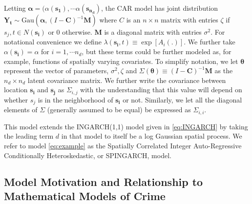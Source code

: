 \documentclass[11pt]{isuthesis}
\begin{document}
  Letting $\boldsymbol{\alpha}=(\alpha(\boldsymbol{s_1}),\cdots \alpha(\boldsymbol{s_{n_d}})$, the CAR model has joint distribution $\boldsymbol{Y_t}\sim \mbox{Gau}(\boldsymbol{\alpha},(I-\boldsymbol{C})^{-1}\boldsymbol{M})$ where $C$ is an $n \times n$ matrix with entries $\zeta$ if $s_j,t \in N(\boldsymbol{s_i})$ or $0$ otherwise. $\boldsymbol{M}$ is a diagonal matrix with entries $\sigma^2$. For notational convenience we define $\lambda(\boldsymbol{s_i},t)\equiv\exp \left[ A_i(.) \right]$.  We further take $\alpha(\boldsymbol{s_i})=\alpha$ for $i=1,\cdots n_d$, but these terms could be further modeled as, for example, functions of spatially varying covariates. To simplify notation, we let $\boldsymbol{\theta}$ represent the vector of parameters, $\sigma^2,\zeta$ and $\Sigma(\boldsymbol{\theta}) \equiv (I-\boldsymbol{C})^{-1}\boldsymbol{M}$ as the $n_{d} \times n_{d}$ latent covariance matrix.  We further write the covariance between location $\boldsymbol{s_i}$ and $\boldsymbol{s_j}$ as $\Sigma_{i,j}$ with the understanding that this value will depend on whether $s_j$ is in the neighborhood of $\boldsymbol{s_i}$ or not.  Similarly, we let all the diagonal elements of $\Sigma$ (generally assumed to be equal) be expressed as $\Sigma_{i,i}$. 

This model extends the INGARCH(1,1) model given in \eqref{eq:INGARCH} by taking the leading term $d$ in that model to itself be a log Gaussian spatial process. We refer to model \eqref{eq:example} as the Spatially Correlated Integer Auto-Regressive Conditionally Heteroskedastic, or SPINGARCH, model.  


\subsection{Model Motivation and Relationship to Mathematical Models of Crime}
\end{document}

